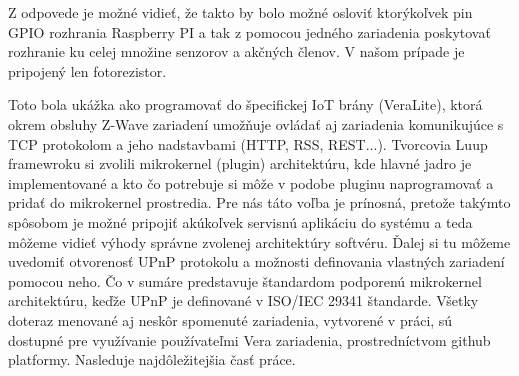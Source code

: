 Z odpovede je možné vidieť, že takto by bolo možné osloviť ktorýkoľvek pin GPIO rozhrania Raspberry PI a tak z pomocou jedného zariadenia poskytovať rozhranie ku celej množine senzorov a akčných členov. V našom prípade je pripojený len fotorezistor. 

\indent Toto bola ukážka ako programovať do špecifickej IoT brány (VeraLite), ktorá okrem obsluhy Z-Wave zariadení umožňuje ovládať aj zariadenia komunikujúce s TCP protokolom a jeho nadstavbami (HTTP, RSS, REST...). Tvorcovia Luup framewroku si zvolili mikrokernel (plugin) architektúru, kde hlavné jadro je implementované a kto čo potrebuje si môže v podobe pluginu naprogramovať a pridať do mikrokernel prostredia. Pre nás táto voľba je prínosná, pretože takýmto spôsobom je možné pripojiť akúkoľvek servisnú aplikáciu do systému a teda môžeme vidieť výhody správne zvolenej architektúry softvéru.
\indent Ďalej si tu môžeme uvedomiť otvorenosť UPnP protokolu a možnosti definovania vlastných zariadení pomocou neho. Čo v sumáre predstavuje štandardom podporenú mikrokernel architektúru, keďže UPnP je definované v ISO/IEC 29341 štandarde. Všetky doteraz menované aj neskôr spomenuté zariadenia, vytvorené v práci, sú dostupné pre využívanie používateľmi Vera zariadenia, prostredníctvom github platformy. Nasleduje najdôležitejšia časť práce.


